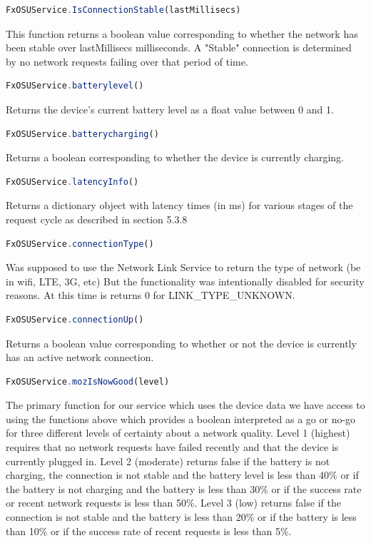 \documentclass[12pt]{article}
\begin{document}
\begin{itemize}
\begin{lstlisting}[language=JavaScript]
FxOSUService.IsConnectionStable(lastMillisecs)
\end{lstlisting}
This function returns a boolean value corresponding to whether the network has been stable over lastMillisecs milliseconds. A "Stable" connection is determined by no network requests failing over that period of time.  
\begin{lstlisting}[language=JavaScript]
FxOSUService.batterylevel()
\end{lstlisting}
Returns the device's current battery level as a float value between 0 and 1.  
\begin{lstlisting}[language=JavaScript]
FxOSUService.batterycharging()
\end{lstlisting}
Returns a boolean corresponding to whether the device is currently charging.  
\begin{lstlisting}[language=JavaScript]
FxOSUService.latencyInfo()
\end{lstlisting}
Returns a dictionary object with latency times (in ms) for various stages of the request cycle as described in section 5.3.8
\begin{lstlisting}[language=JavaScript]
FxOSUService.connectionType()
\end{lstlisting}  
Was supposed to use the Network Link Service to return the type of network (be in wifi, LTE, 3G, etc) But the functionality was intentionally disabled for security reasons.  At this time is returns 0 for LINK\_TYPE\_UNKNOWN. 
\begin{lstlisting}[language=JavaScript]
FxOSUService.connectionUp()
\end{lstlisting}
Returns a boolean value corresponding to whether or not the device is currently has an active network connection. 
\begin{lstlisting}[language=JavaScript]
FxOSUService.mozIsNowGood(level)
\end{lstlisting}
The primary function for our service which uses the device data we have access to using the functions above which provides a boolean interpreted as a go or no-go for three different levels of certainty about a network quality. Level 1 (highest) requires that no network requests have failed recently and that the device is currently plugged in.  Level 2 (moderate) returns false if the battery is not charging, the connection is not stable and the battery level is less than 40\% or if the battery is not charging and the battery is less than 30\% or if the success rate or recent network requests is less than 50\%. Level 3 (low) returns false if the connection is not stable and the battery is less than 20\% or if the battery is less than 10\% or if the success rate of recent requests is less than 5\%.
\end{itemize}
\pagebreak
\end{document}
